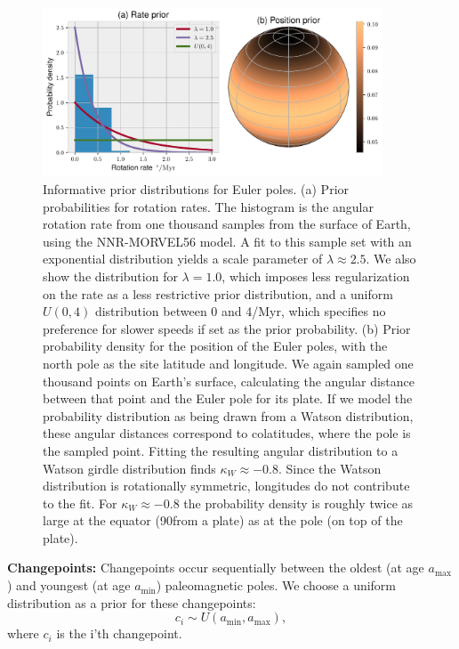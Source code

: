 \documentclass[11pt,letterpaper]{article}
\begin{document}
\begin{figure}
\includegraphics[width=0.9\textwidth]{fig_euler_pole_prior.pdf}
\caption[Informative prior distributions for Euler poles]{Informative prior distributions for Euler poles. (a) Prior probabilities for rotation rates. The histogram is the angular rotation rate from one thousand samples from the surface of Earth, using the NNR-MORVEL56 model. A fit to this sample set with an exponential distribution yields a scale parameter of $\lambda \approx 2.5$. We also show the distribution for $\lambda = 1.0$, which imposes less regularization on the rate as a less restrictive prior distribution, and a uniform $U(0,4)$ distribution between 0 and 4\textdegree/Myr, which specifies no preference for slower speeds if set as the prior probability. (b) Prior probability density for the position of the Euler poles, with the north pole as the site latitude and longitude.  We again sampled one thousand points on Earth's surface, calculating the angular distance between that point and the Euler pole for its plate.  If we model the probability distribution as being drawn from a Watson distribution, these angular distances correspond to colatitudes, where the pole is the sampled point.  Fitting the resulting angular distribution to a Watson girdle distribution finds $\kappa_W \approx -0.8$. Since the Watson distribution is rotationally symmetric, longitudes do not contribute to the fit. For $\kappa_W \approx -0.8$ the probability density is roughly twice as large at the equator (90\textdegree from a plate) as at the pole (on top of the plate).}
\label{fig:euler_pole_prior}
\end{figure}

\textbf{Changepoints:} 
Changepoints occur sequentially between the oldest (at age $a_\mathrm{max}$) and youngest (at age $a_\mathrm{min}$) paleomagnetic poles. We choose a uniform distribution as a prior for these changepoints:
\begin{equation}
c_i \sim U( a_\mathrm{min}, a_\mathrm{max}),
\end{equation}
where $c_i$ is the i'th changepoint.
\end{document}
